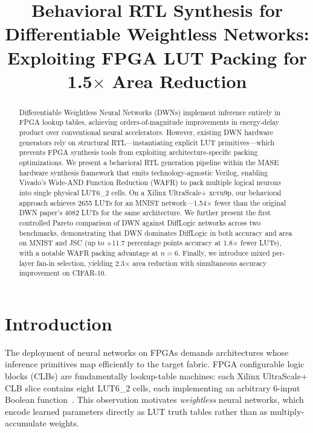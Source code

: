 \documentclass[conference]{IEEEtran}
\begin{document}
\title{Behavioral RTL Synthesis for Differentiable Weightless Networks: Exploiting FPGA LUT Packing for 1.5$\times$ Area Reduction}

\author{
}

\maketitle

\begin{abstract}
Differentiable Weightless Neural Networks (DWNs) implement inference entirely in FPGA lookup tables, achieving orders-of-magnitude improvements in energy-delay product over conventional neural accelerators.
However, existing DWN hardware generators rely on structural RTL---instantiating explicit LUT primitives---which prevents FPGA synthesis tools from exploiting architecture-specific packing optimizations.
We present a behavioral RTL generation pipeline within the MASE hardware synthesis framework that emits technology-agnostic Verilog, enabling Vivado's Wide-AND Function Reduction (WAFR) to pack multiple logical neurons into single physical LUT6\_2 cells.
On a Xilinx UltraScale+ xcvu9p, our behavioral approach achieves \num{2655} LUTs for an MNIST network---1.54$\times$ fewer than the original DWN paper's \num{4082} LUTs for the same architecture.
We further present the first controlled Pareto comparison of DWN against DiffLogic networks across two benchmarks, demonstrating that DWN dominates DiffLogic in both accuracy and area on MNIST and JSC (up to $+$11.7 percentage points accuracy at 1.8$\times$ fewer LUTs), with a notable WAFR packing advantage at $n{=}6$.
Finally, we introduce mixed per-layer fan-in selection, yielding 2.3$\times$ area reduction with simultaneous accuracy improvement on CIFAR-10.
\end{abstract}

\section{Introduction}
\label{sec:intro}

The deployment of neural networks on FPGAs demands architectures whose inference primitives map efficiently to the target fabric.
FPGA configurable logic blocks (CLBs) are fundamentally lookup-table machines: each Xilinx UltraScale+ CLB slice contains eight LUT6\_2 cells, each implementing an arbitrary 6-input Boolean function~\cite{xilinx2021ultrascale}.
This observation motivates \emph{weightless} neural networks, which encode learned parameters directly as LUT truth tables rather than as multiply-accumulate weights.
\end{document}
